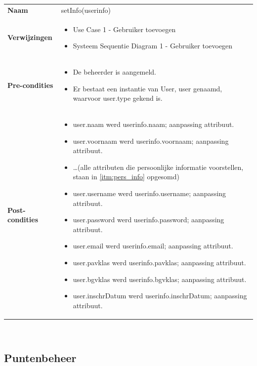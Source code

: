 \documentclass[a4paper]{article}
\begin{document}
\begin{tabularx}{\textwidth}{|l X|}
    \hline
    \textbf{Naam} & setInfo(userinfo) \\
    \textbf{Verwijzingen} & \begin{itemize}[leftmargin=*]
        \item Use Case 1 - Gebruiker toevoegen
        \item Systeem Sequentie Diagram 1 - Gebruiker toevoegen
    \end{itemize}\\
    \textbf{Pre-condities} & \begin{itemize}[leftmargin=*]
        \item De beheerder is aangemeld.
        \item Er bestaat een instantie van User, user genaamd, waarvoor user.type gekend is.
    \end{itemize}\\
    \textbf{Post-condities} & \begin{itemize}[leftmargin=*]
        \item user.naam werd userinfo.naam; aanpassing attribuut.
        \item user.voornaam werd userinfo.voornaam; aanpassing attribuut.
        \item \dots  (alle attributen die persoonlijke informatie voorstellen, staan in \ref{itm:pers_info} opgesomd)
        \item user.username werd userinfo.username; aanpassing attribuut.
        \item user.password werd userinfo.password; aanpassing attribuut.
        \item user.email werd userinfo.email; aanpassing attribuut.
        \item user.pavklas werd userinfo.pavklas; aanpassing attribuut.
        \item user.bgvklas werd userinfo.bgvklas; aanpassing attribuut.
        \item user.inschrDatum werd userinfo.inschrDatum; aanpassing attribuut.
    \end{itemize}\\
    \hline
\end{tabularx}\\

\subsection{Puntenbeheer}
\end{document}

